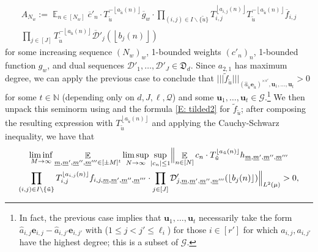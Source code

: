 \documentclass[11pt]{amsart}
\theoremstyle{definition}
\DeclareMathOperator*{\E}{\mathbb{E}}
\newcommand{\N}{{\mathbb N}}
\newcommand{\CD}{{\mathcal D}}
\newcommand{\CG}{{\mathcal G}}
\newcommand{\CQ}{{\mathcal Q}}
\newcommand{\be}{{\mathbf{e}}}
\newcommand{\bu}{{\mathbf{u}}}
\newcommand{\um}{{\underline{m}}}
\newcommand{\nnorm}[1]{\lvert\!|\!| #1|\!|\!\rvert}
\newcommand{\1}{{\mathbf{1}}}
\newcommand{\floor}[1]{{\left \lfloor #1 \right \rfloor}}
\begin{document}
\begin{multline}\label{E: tilded22}
    A_{N_{w}}:=\E_{n\in[N_{w}]} \overline{c}'_{n}\cdot T_{\tilde{u}}^{-\floor{a_{\tilde{u}}(n)}}\overline{g}_{w}\cdot\prod_{(i,j)\in I\backslash\{\tilde{u}\}}T_{i,j}^{\floor{a_{i,j}(n)}}T_{\tilde{u}}^{-\floor{a_{\tilde{u}}(n)}}\overline{f}_{i,j}
        \\
        \prod_{j\in [J]}T_{\tilde{u}}^{-\floor{a_{\tilde{u}}(n)}}\overline{\mathcal{D}}'_{j}(\floor{b_{j}(n)})
\end{multline}
     for some increasing sequence $(N_{w})_{w}$, 1-bounded weights $(c'_{n})_n$, 1-bounded function $g_{w}$, and dual sequences $\mathcal{D}'_{1},\dots,\mathcal{D}'_{J}\in\mathfrak{D}_{d}$.
     Since $a_{2,1}$ has maximum degree, we can apply the previous case to conclude that $\nnorm{\tilde{f}_{\tilde{u}}}_{(\hat{a}_{\tilde{u}}\be_{\tilde{u}})^{\times s'},\bu_{1},\dots,\bu_{t}}>0$ for some $t\in\N$ (depending only on $d,J,\ell,\CQ$) and some $\bu_{1},\dots,\bu_{t}\in\CG$.\footnote{In fact, the previous case implies that $\bu_{1},\dots,\bu_{t}$ necessarily take the form $\hat{a}_{i,j}\be_{i,j}-\hat{a}_{i,j'}\be_{i,j'}$ with ($1\leq j<j'\leq \ell_i$) for those $i\in[r']$ for which $a_{i,j}, a_{i,j'}$  have the highest degree; this is a subset of $\CG$.}
      We then unpack this seminorm using \cite[Lemma~11.11]{DKKST24} and the formula \eqref{E: tilded2} for $\tilde{f}_{\tilde{u}}$; after composing the resulting expression with $T_{\tilde{u}}^{\floor{a_{\tilde{u}}(n)}}$ and applying the Cauchy-Schwarz inequality, we have that 
      \begin{multline*}
          \liminf_{M\to\infty}\E_{\um, \um',\um'',\um'''\in [\pm M]^{t}}\limsup_{N\to\infty} \sup_{|c_n|\leq 1}\Bigl\Vert\E_{n\in[N]}c_n\cdot T_{\tilde{u}}^{\floor{a_{\tilde{u}}(n)}} h_{\um,\um',\um'',\um'''}
   \\\prod_{(i,j)\in I\backslash\{\tilde{u}\}}T_{i,j}^{\floor{a_{i,j}(n)}}f_{i,j,\um,\um',\um'',\um'''}\cdot \prod_{j\in[J]} \CD'_{j,\um,\um',\um'',\um'''}(\floor{b_{j}(n)})\Bigr\Vert_{L^2(\mu)} >0,
      \end{multline*}
\end{document}
